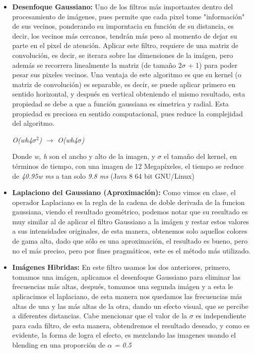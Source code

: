 \documentclass[12pt]{article}
\begin{document}
\begin{description}
\begin{itemize}
    \item \textbf{Desenfoque Gaussiano:} Uno de los filtros m\'as importantes dentro del procesamiento de im\'agenes,
    pues permite que cada pixel tome "informaci\'on" de sus vecinos, ponderando su imporntacia en funci\'on de su
    distancia, es decir, los vecinos m\'as cercanos, tendr\'an m\'as peso al momento de dejar su parte en el pixel
    de atenci\'on. Aplicar este filtro, requiere de una matriz de convoluci\'on, es decir, se iterara sobre las
    dimensiones de la im\'agen, pero adem\'as se recorrera linealmente la matriz (de tamaño 2$\sigma$ + 1) para
    poder pesar sus pixeles vecinos. Una ventaja de este algoritmo es que su kernel (o matriz de convoluci\'on)
    es separable, es decir, se puede aplicar primero en sentido horizontal, y despu\'es en vertical obteniendo 
    el mismo resultado, esta propiedad se debe a que a funci\'on gaussiana es simetrica y radial. Esta propiedad
    es preciosa en sentido computacional, pues reduce la complejidad del algoritmo.
    \begin{center}
     \textit{O(wh4$\sigma$$^{2}$) $\longrightarrow$ O(wh4$\sigma$) }
     \end{center} 
     Donde \textit{w, h} son el ancho y alto de la imagen, y \textit{$\sigma$} el tamaño del kernel, en 
     t\'erminos de tiempo, con una imagen de 12 Megap\'ixeles, el tiempo se reduce de \textit{ 40.95w ms}
     a tan solo \textit{ 9.8 ms} (Java 8 64 bit GNU/Linux)
     
     \item \textbf{Laplaciono del Gaussiano (Aproximaci\'on): } Como vimos en clase, el operador Laplaciano es la regla de 
     la cadena de doble derivada de la funcion gaussiana, viendo el resultado geom\'etrico, podemos notar que 
     su resultado es muy similar al de aplicar el filtro Gaussiano a la im\'agen y restar estos valores a sus
     intensidades originales, de esta manera, obtenemos solo aquellos colores de gama alta, dado que s\'olo es una
     aproximaci\'on, el resultado es bueno, pero no el m\'as preciso, pero por fines pragm\'aticos, este es el 
     m\'etodo m\'as utilizado.
     
     \item \textbf{Im\'agenes Hibridas: } En este filtro usamos los dos anteriores, primero, tomamos una im\'agen, 
     aplicamos el desenfoque Gaussiano para eliminar las frecuencias m\'as altas, despu\'es, tomamos una segunda 
     im\'agen y a esta le aplicacimos el laplaciano, de esta manera nos quedamos las frecuencias m\'as altas de 
     una y las m\'as altas de la otra, dando un efecto visual, que se percibe  a diferentes distancias. Cabe 
     mencionar que el valor de la $\sigma$ es independiente para cada filtro, de esta manera, obtendremos el 
     resultado deseado, y como es evidente, la forma de logra el efecto, es mezclando las imagenes usando el 
     blending en una proporci\'on de \textit{ $\alpha$ = 0.5}\\
     

\end{itemize}
\end{description}
\end{document}
